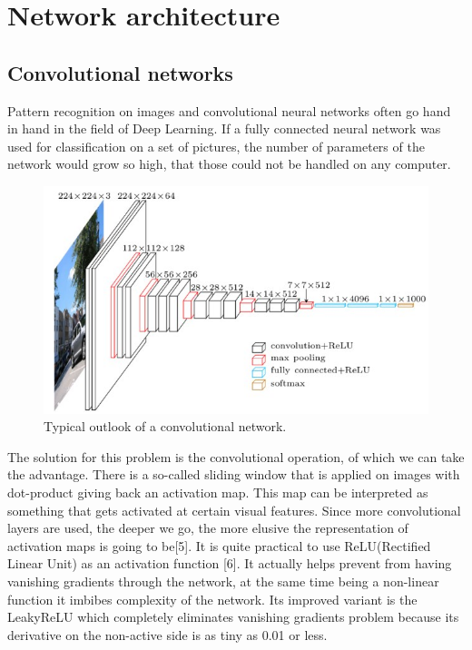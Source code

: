 \documentclass{article}
\begin{document}
\section{Network architecture}
\subsection{Convolutional networks}

Pattern recognition on images and convolutional neural networks often go hand in hand in the field of Deep Learning. If a fully connected neural network was used for classification on a set of pictures, the number of parameters of the network would grow so high, that those could not be handled on any computer.

\begin{figure}[!h]
    \includegraphics[scale = 0.6]{images/conv}
	\centering
	\caption{Typical outlook of a convolutional network.}
\end{figure}

The solution for this problem is the convolutional operation, of which we can take the advantage. There is a so-called sliding window that is applied on images with dot-product giving back an activation map. This map can be interpreted as something that gets activated at certain visual features. Since more convolutional layers are used, the deeper we go, the more elusive the representation of activation maps is going to be[5]. It is quite practical to use ReLU(Rectified Linear Unit)
as an activation function [6]. It actually helps prevent from having vanishing gradients through the network, at the same time being a non-linear function it imbibes complexity of the network. Its improved variant is the LeakyReLU which completely eliminates vanishing gradients problem because its derivative on the non-active side is as tiny as 0.01 or less.
\end{document}
